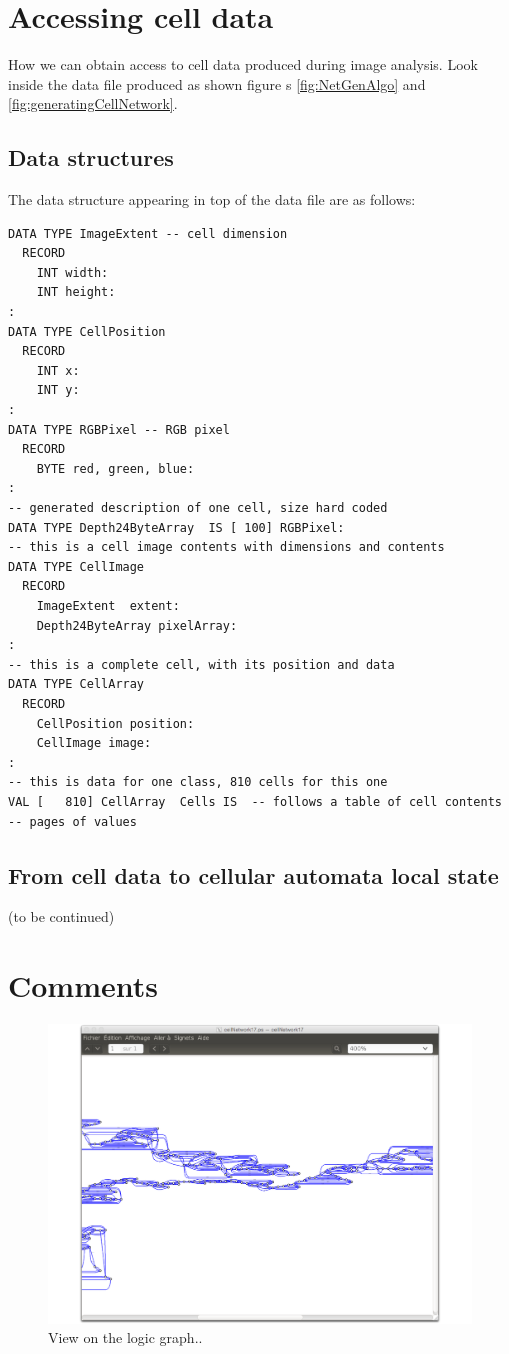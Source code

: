 \section { Accessing cell data}

How we can obtain access to cell data produced during image analysis. Look inside
the data file produced as shown figure s \ref{fig:NetGenAlgo} and \ref{fig:generatingCellNetwork}.

\subsection {Data structures }

The data structure appearing in top of the data file are as follows:
\begin{lstlisting}
DATA TYPE ImageExtent -- cell dimension
  RECORD
    INT width:
    INT height:
:
DATA TYPE CellPosition
  RECORD
    INT x:
    INT y:
:
DATA TYPE RGBPixel -- RGB pixel
  RECORD
    BYTE red, green, blue:
:
-- generated description of one cell, size hard coded
DATA TYPE Depth24ByteArray  IS [ 100] RGBPixel:
-- this is a cell image contents with dimensions and contents
DATA TYPE CellImage
  RECORD
    ImageExtent  extent:
    Depth24ByteArray pixelArray:
:
-- this is a complete cell, with its position and data
DATA TYPE CellArray
  RECORD
    CellPosition position:
    CellImage image:
:
-- this is data for one class, 810 cells for this one
VAL [   810] CellArray  Cells IS  -- follows a table of cell contents
-- pages of values
\end{lstlisting}


\subsection {From cell data to cellular automata local state }

(to be continued)






\section { Comments}

\begin{figure}[hbtp]
\begin{center} 
\includegraphics[width=12cm]{Diego2Networks.pdf}
\caption{View on the logic graph..}
\label{fig:antisrananaClass17bis}
\end{center}
\end{figure}

